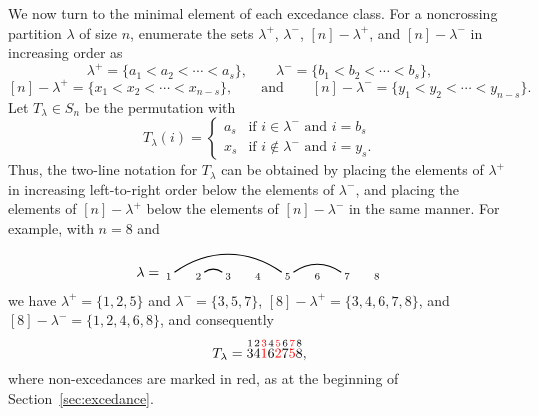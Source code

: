 \documentclass[12pt]{amsart}
\theoremstyle{definition}
\theoremstyle{remark}
\numberwithin{equation}{section}
\renewcommand{\setminus}{-}
\begin{document}

We now turn to the minimal element of each excedance class.  For a noncrossing partition $\lambda$ of size $n$, enumerate the sets $\lambda^{+}$, $\lambda^{-}$, $[n] \setminus \lambda^{+}$, and  $[n] \setminus \lambda^{-}$ in increasing order as
\[
\lambda^{+} = \{a_{1} < a_{2} < \cdots < a_{s}\},
\qquad
\lambda^{-} = \{b_{1} < b_{2} < \cdots < b_{s}\},
\]
\[
[n] \setminus \lambda^{+} = \{x_{1} < x_{2} < \cdots < x_{n-s}\},
\qquad\text{and}\qquad
[n] \setminus \lambda^{-} = \{y_{1} < y_{2} < \cdots < y_{n-s}\}.
\]
Let $T_{\lambda} \in S_{n}$ be the permutation with
\[
T_{\lambda}(i) = \begin{cases} a_{s} & \text{if $i \in \lambda^{-}$ and $i = b_{s}$} \\ x_{s} & \text{if $i \notin \lambda^{-}$ and $i = y_{s}$.}  \end{cases}
\]
Thus, the two-line notation for $T_{\lambda}$ can be obtained by placing the elements of $\lambda^{+}$ in increasing left-to-right order below the elements of $\lambda^{-}$, and placing the elements of $[n] \setminus \lambda^{+}$ below the elements of $[n] \setminus \lambda^{-}$ in the same manner.  For example, with $n = 8$ and 
\[
\lambda = \begin{tikzpicture}[scale = 0.75, baseline = 0.75*-0.2]
\foreach \x in {1, ..., 8}{\draw[fill] (\x - 1, 0) node[inner sep = 2pt] (\x) {$\scriptstyle \x$};}
\foreach \i\j in {1/5, 2/3, 5/7}{\draw[thick] (\i) to[out = 35, in = 145] (\j);}
\end{tikzpicture}
\]
we have $\lambda^{+} = \{1, 2, 5\}$ and $\lambda^{-} = \{3, 5, 7\}$, $[8] \setminus \lambda^{+} = \{3, 4, 6, 7, 8\}$, and $[8] \setminus \lambda^{-} = \{1, 2, 4, 6, 8\}$, and consequently
\[
T_{\lambda} = \overset{1}{3} \overset{2}{4} {\color{red} \overset{3}{1}} \overset{4}{6} {\color{red} \overset{5}{2}} \overset{6}{7} {\color{red} \overset{7}{5}} \overset{8}{8},
\]
where non-excedances are marked in red, as at the beginning of Section~\ref{sec:excedance}.
\end{document}
